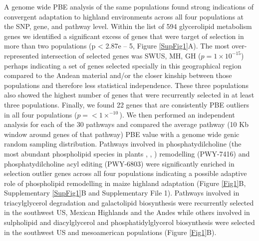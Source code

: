 \documentclass[9pt,twocolumn,twoside]{BioRxiv}
\begin{document}
A genome wide PBE analysis of the same populations \cite{Wang2020-mp} found strong indications of convergent adaptation to highland environments across all four populations at the SNP, gene, and pathway level.
Within the list of 594 glycerolipid metabolism genes we identified a significant excess of genes that were target of selection in more than two populations (p < 2.87e – 5, Figure \ref{SupFig1}A).  
The most over-represented intersection of selected genes was SWUS, MH, GH ($p = 1  \times 10 ^{-15} $) perhaps indicating a set of genes selected specially in this geographical region compared to the Andean material and/or the closer kinship between those populations and therefore less statistical independence. 
These three populations also showed the highest number of genes that were recurrently selected in at least three populations.
Finally, we found 22 genes that are consistently PBE outliers in all four populations ($p =<1  \times  ^{-10}$). 
We then performed an independent analysis for each of the 30 pathways and compared the average pathway (10 Kb window around genes of that pathway) PBE value with a genome wide genic random sampling distribution. 
Pathways involved in phosphatydilcholine (the most abundant phospholipid species in plants \citep{Gu2017-nd}, \citep{Poincelot1976-qe}, \citep{Hawke1974-ab}) remodelling (PWY-7416) and phosphatydilcholine acyl editing (PWY-6803) were significantly enriched in selection outlier genes across all four populations indicating a possible adaptive role of phospholipid remodelling in maize highland adaptation (Figure \ref{Fig1}B, Supplementary \ref{SupFig1}B and Supplementary File 1). 
Pathways involved in triacylglycerol degradation and galactolipid biosynthesis were recurrently selected in the southwest US, Mexican Highlands and the Andes while others involved in sulpholipid and diacylglycerol and phosphatidylglycerol biosynthesis were selected in the southwest US and mesoamerican populations (Figure \ref{Fig1}B).  
\end{document}
